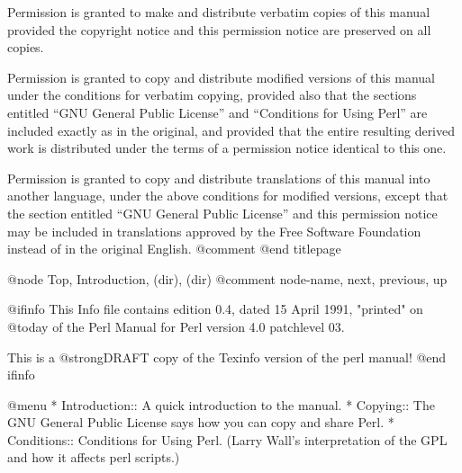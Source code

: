 Permission is granted to make and distribute verbatim copies of this
manual provided the copyright notice and this permission notice are
preserved on all copies.

Permission is granted to copy and distribute modified versions of this
manual under the conditions for verbatim copying, provided also that the
sections entitled ``GNU General Public License'' and ``Conditions for
Using Perl'' are included exactly as in the original, and provided that
the entire resulting derived work is distributed under the terms of a
permission notice identical to this one.

Permission is granted to copy and distribute translations of this manual
into another language, under the above conditions for modified versions,
except that the section entitled ``GNU General Public License'' and this
permission notice may be included in translations approved by the Free
Software Foundation instead of in the original English.
@comment %
@end titlepage

@node     Top, Introduction, (dir), (dir)
@comment  node-name,  next,  previous,  up

@ifinfo
This Info file contains edition 0.4, dated 15 April 1991, "printed" on
@today{} of the Perl Manual for Perl version 4.0 patchlevel 03.

This is a @strong{DRAFT} copy of the Texinfo version of the perl manual!
@end ifinfo

@menu
* Introduction::        A quick introduction to the manual.
* Copying::             The GNU General Public License says how you can
                          copy and share Perl.
* Conditions::          Conditions for Using Perl. (Larry Wall's interpretation
                          of the GPL and how it affects perl scripts.)

